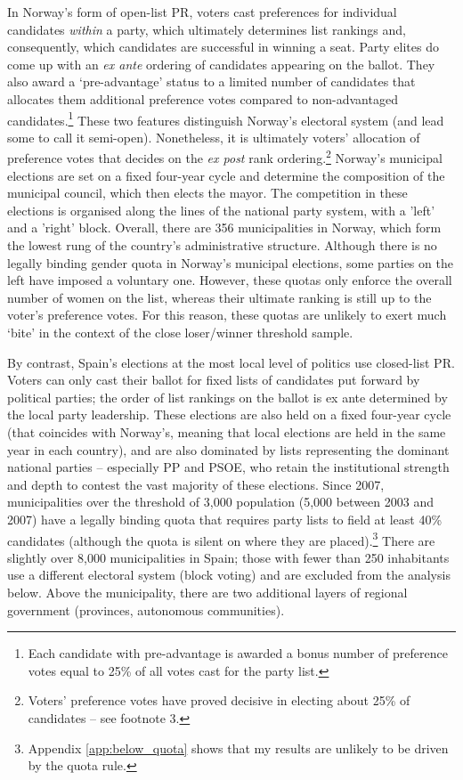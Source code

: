 \documentclass[12pt]{article}
\begin{document}
In Norway's form of open-list PR, voters cast preferences for individual candidates \emph{within} a party, which ultimately determines list rankings and, consequently, which candidates are successful in winning a seat. Party elites do come up with an \emph{ex ante} ordering of candidates appearing on the ballot. They also award a `pre-advantage' status to a limited number of candidates that allocates them additional preference votes compared to non-advantaged candidates.\footnote{Each candidate with pre-advantage is awarded a bonus number of preference votes equal to 25\% of all votes cast for the party list.} These two features distinguish Norway's electoral system (and lead some to call it semi-open). Nonetheless, it is ultimately voters' allocation of preference votes that decides on the \emph{ex post} rank ordering.\footnote{Voters' preference votes have proved decisive in electing about 25\% of candidates -- see footnote 3.} Norway's municipal elections are set on a fixed four-year cycle and determine the composition of the municipal council, which then elects the mayor. The competition in these elections is organised along the lines of the national party system, with a 'left' and a 'right' block. Overall, there are 356 municipalities in Norway, which form the lowest rung of the country's administrative structure. Although there is no legally binding gender quota in Norway's municipal elections, some parties on the left have imposed a voluntary one. However, these quotas only enforce the overall number of women on the list, whereas their ultimate ranking is still up to the voter's preference votes. For this reason, these quotas are unlikely to exert much `bite' in the context of the close loser/winner threshold sample.

By contrast, Spain's elections at the most local level of politics use closed-list PR. Voters can only cast their ballot for fixed lists of candidates put forward by political parties; the order of list rankings on the ballot is ex ante determined by the local party leadership. These elections are also held on a fixed four-year cycle (that coincides with Norway's, meaning that local elections are held in the same year in each country), and are also dominated by lists representing the dominant national parties -- especially PP and PSOE, who retain the institutional strength and depth to contest the vast majority of these elections. Since 2007, municipalities over the threshold of 3,000 population (5,000 between 2003 and 2007) have a legally binding quota that requires party lists to field at least 40\% candidates (although the quota is silent on where they are placed).\footnote{Appendix \ref{app:below_quota} shows that my results are unlikely to be driven by the quota rule.} There are slightly over 8,000 municipalities in Spain; those with fewer than 250 inhabitants use a different electoral system (block voting) and are excluded from the analysis below. Above the municipality, there are two additional layers of regional government (provinces, autonomous communities).
\end{document}
